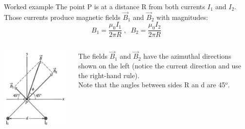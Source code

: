 {\begin{frame}{Worked example}
{\small
          The point P is at a distance R from both currents $I_1$ and
          $I_2$. Those currents produce magnetic fields $\vec{B}_1$
          and $\vec{B}_2$ with magnitudes:\\
          \begin{equation*}
             B_1 = \frac{\mu_0I_1}{2\pi R} \;,\;\;
             B_2 = \frac{\mu_0I_2}{2\pi R}
         \end{equation*}
}
\begin{columns}
  \begin{column}{0.32\textwidth}
    \begin{center}
      \includegraphics[width=0.98\textwidth]{./images/problems/lect5_Bfield_2wires_2.png}\\
    \end{center}
  \end{column}
  \begin{column}{0.68\textwidth}
    {\small
          The fields $\vec{B}_1$ and $\vec{B}_2$ have the azimuthal
          directions shown on the left (notice the current direction
          and use the right-hand rule).\\
          Note that the angles between sides R an d are 45$^o$.\\
}
\end{column}
\end{columns}
\end{frame}}
